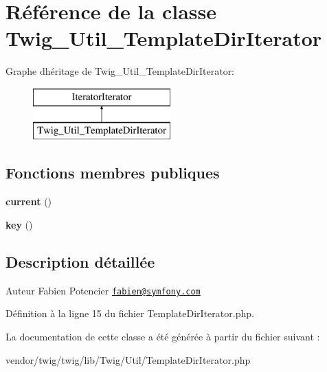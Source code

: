 \hypertarget{class_twig___util___template_dir_iterator}{}\section{Référence de la classe Twig\+\_\+\+Util\+\_\+\+Template\+Dir\+Iterator}
\label{class_twig___util___template_dir_iterator}
Graphe d\textquotesingle{}héritage de Twig\+\_\+\+Util\+\_\+\+Template\+Dir\+Iterator\+:\begin{figure}[H]
\begin{center}
\leavevmode
\includegraphics[height=2.000000cm]{class_twig___util___template_dir_iterator}
\end{center}
\end{figure}
\subsection*{Fonctions membres publiques}
\begin{DoxyCompactItemize}
\item 
{\bfseries current} ()\hypertarget{class_twig___util___template_dir_iterator_af343507d1926e6ecf964625d41db528c}{}\label{class_twig___util___template_dir_iterator_af343507d1926e6ecf964625d41db528c}

\item 
{\bfseries key} ()\hypertarget{class_twig___util___template_dir_iterator_a729e946b4ef600e71740113c6d4332c0}{}\label{class_twig___util___template_dir_iterator_a729e946b4ef600e71740113c6d4332c0}

\end{DoxyCompactItemize}


\subsection{Description détaillée}
\begin{DoxyAuthor}{Auteur}
Fabien Potencier \href{mailto:fabien@symfony.com}{\tt fabien@symfony.\+com} 
\end{DoxyAuthor}


Définition à la ligne 15 du fichier Template\+Dir\+Iterator.\+php.



La documentation de cette classe a été générée à partir du fichier suivant \+:\begin{DoxyCompactItemize}
\item 
vendor/twig/twig/lib/\+Twig/\+Util/Template\+Dir\+Iterator.\+php\end{DoxyCompactItemize}
